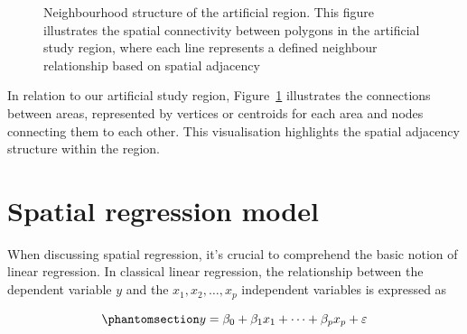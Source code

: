 \documentclass[
  default,
]{sn-jnl}
\begin{document}
\label{cell-fig-neighartfreg}
\begin{figure}[H]


\caption{\label{fig-neighartfreg}Neighbourhood structure of the
artificial region. This figure illustrates the spatial connectivity
between polygons in the artificial study region, where each line
represents a defined neighbour relationship based on spatial adjacency}

\end{figure}%

In relation to our artificial study region,
Figure~\ref{fig-neighartfreg} illustrates the connections between areas,
represented by vertices or centroids for each area and nodes connecting
them to each other. This visualisation highlights the spatial adjacency
structure within the region.

\section{Spatial regression model}\label{spatial-regression-model}

When discussing spatial regression, it's crucial to comprehend the basic
notion of linear regression. In classical linear regression, the
relationship between the dependent variable \(y\) and the
\(x_1,x_2, \dots, x_p\) independent variables is expressed as

\begin{equation}\phantomsection\label{eq-basicreg}{
y = \beta_0 + \beta_1x_1 + \dots + \beta_p x_p + \varepsilon
}\end{equation}
\end{document}
